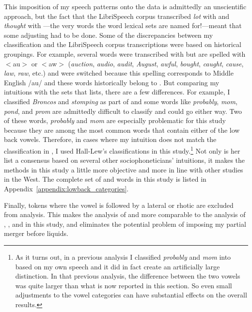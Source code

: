 This imposition of my speech patterns onto the data is admittedly an unscientific approach, but the fact that the LibriSpeech corpus transcribed \textit{lot} with \thought and \textit{thought} with \lot---the very words the word lexical sets are named for!---meant that some adjusting had to be done. Some of the discrepancies between my classification and the LibriSpeech corpus transcriptions were based on historical groupings. For example, several words were transcribed with \lot but are spelled with $<$au$>$ or $<$aw$>$ (\textit{auction}, \textit{audio}, \textit{audit}, \textit{August}, \textit{awful}, \textit{bought}, \textit{caught}, \textit{cause}, \textit{law}, \textit{raw}, etc.) and were switched because this spelling corresponds to Middle English /au/ and these words historically belong to \thought \citep[115]{wells_1982}. But comparing my intuitions with the sets that \citet[133--134]{hall_lew_2009_diss} lists, there are a few differences. For example, I classified \textit{Broncos} and \textit{stomping} as part of \thought and some words like \textit{probably}, \textit{mom}, \textit{pond}, and \textit{prom} are admittedly difficult to classify and could go either way. Two of these words, \textit{probably} and \textit{mom} are especially problematic for this study because they are among the most common words that contain either of the low back vowels. Therefore, in cases where my intuition does not match the classification in \citet[133--134]{hall_lew_2009_diss}, I used Hall-Lew's classifications in this study.\footnote{As it turns out, in a previous analysis I classified \textit{probably} and \textit{mom} into \thought based on my own speech and it did in fact create an artificially large distinction. In that previous analysis, the difference between the two vowels was quite larger than what is now reported in this section. So even small adjustments to the vowel categories can have substantial effects on the overall results.} Not only is her list a consensus based on several other sociophoneticians' intuitions, it makes the methods in this study a little more objective and more in line with other studies in the West. The complete set of \lot and \thought words in this study is listed in Appendix~\ref{appendix:lowback_categories}.

Finally, tokens where the vowel is followed by a lateral or rhotic are excluded from analysis. This makes the analysis of \lot and \thought more comparable to the analysis of \trap, \dress, and \kit in this study, and eliminates the potential problem of imposing my partial merger before liquids.


